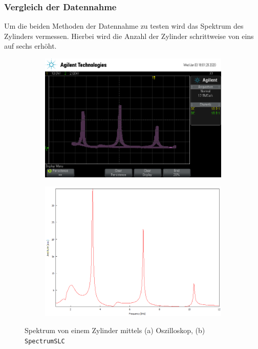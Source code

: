 \subsubsection{Vergleich der Datennahme}
Um die beiden Methoden der Datennahme zu testen wird das Spektrum des Zylinders vermessen.
Hierbei wird die Anzahl der Zylinder schrittweise von eins auf sechs erhöht.
\FloatBarrier
\begin{figure}
    \begin{subfigure}[c]{width=0.45\textwidth}
        \includegraphics[width=\textwidth]{figure/1Zylinder.png}
    \end{subfigure}
    \begin{subfigure}[c]{width=0.45\textwidth}
        \includegraphics[width=\textwidth]{figure/1_Zylinder.png}
    \end{subfigure}
    \caption{Spektrum von einem Zylinder mittels (a) Oszilloskop, (b) \texttt{SpectrumSLC}}
\end{figure}
